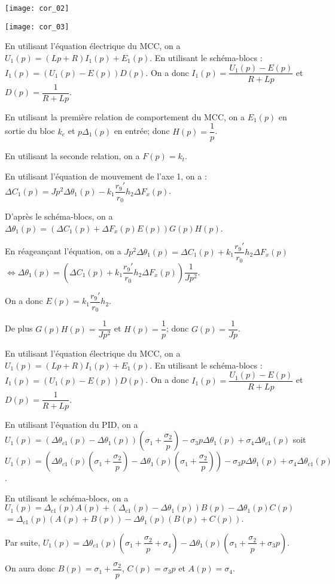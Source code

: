 \ifprof
\begin{center}
\texttt{[image: cor\_02]}

\texttt{[image: cor\_03]}
\end{center}
\begin{corrige} 

En utilisant l'équation électrique du MCC, on a 
$U_1(p)=\left(L p   + R\right)I_1(p)+E_1(p)$. En utilisant le schéma-blocs :  $I_1(p)=\left(U_1(p) - E(p)\right) D(p)$. On a donc 
$I_1(p)=\dfrac{U_1(p) - E(p)}{R+Lp}$ et $D(p) = \dfrac{1}{R+Lp}$.

En utilisant la première relation de comportement du MCC, on a $E_1(p)$ en sortie du bloc $k_e$ et $p\Delta_1(p)$ en entrée; donc $H(p)=\dfrac{1}{p}$.

En utilisant la seconde relation, on a $F(p)=k_t$.

En utilisant l'équation de mouvement de l'axe 1, on a :
$\Delta C_1(p)=J p ^2  \Delta \theta_1(p) - k_1 \dfrac{r_9'}{r_0}h_2 \Delta F_x(p)$.

D'après le schéma-blocs, on a $\Delta \theta_1(p) = \left(\Delta C_1(p)+\Delta F_x(p) E(p)\right) G(p)H(p)$.

En réageançant l'équation, on a 
$J p ^2  \Delta \theta_1(p) = \Delta C_1(p) +  k_1 \dfrac{r_9'}{r_0}h_2 \Delta F_x(p) $
$ \Leftrightarrow   \Delta \theta_1(p) = \left(\Delta C_1(p) +  k_1 \dfrac{r_9'}{r_0}h_2 \Delta F_x(p)\right) \dfrac{1}{J p ^2} $.

On a donc $E(p)= k_1 \dfrac{r_9'}{r_0}h_2 $. 

De plus $G(p)H(p)=\dfrac{1}{Jp^2}$ et $H(p)=\dfrac{1}{p}$; donc $G(p)=\dfrac{1}{Jp}$.


En utilisant l'équation électrique du MCC, on a 
$U_1(p)=\left(L p   + R\right)I_1(p)+E_1(p)$. En utilisant le schéma-blocs :  $I_1(p)=\left(U_1(p) - E(p)\right) D(p)$. On a donc 
$I_1(p)=\dfrac{U_1(p) - E(p)}{R+Lp}$ et $D(p) = \dfrac{1}{R+Lp}$.


En utilisant l'équation du PID, on a 
$U_1(p)=\left( \Delta \theta_{c1}(p)-\Delta \theta_1(p)\right) \left(\sigma_1 + \dfrac{\sigma_2}{p}\right)- \sigma_3p \Delta \theta_1(p)+\sigma_4\Delta \theta_{c1}(p)$
soit $U_1(p)=\left( \Delta \theta_{c1}(p) \left(\sigma_1 + \dfrac{\sigma_2}{p}\right) -\Delta \theta_1(p) \left(\sigma_1 + \dfrac{\sigma_2}{p}\right)\right) - \sigma_3p \Delta \theta_1(p)+\sigma_4\Delta \theta_{c1}(p)$.

En utilisant le schéma-blocs, on a 
$U_1(p)=\Delta_{c1}(p) A(p) + \left(\Delta_{c1}(p) -\Delta\theta_{1}(p)\right) B(p) - \Delta\theta_{1}(p)C(p)$
$=\Delta_{c1}(p) \left( A(p) + B(p)\right) -\Delta\theta_{1}(p)  \left(B(p)+C(p)\right)$.

Par suite, 
$U_1(p)= \Delta \theta_{c1}(p) \left(\sigma_1 + \dfrac{\sigma_2}{p} +\sigma_4\right) -\Delta \theta_1(p) \left(\sigma_1 + \dfrac{\sigma_2}{p} + \sigma_3p\right)$.

On aura donc $B(p)=\sigma_1 + \dfrac{\sigma_2}{p}$, $C(p)=\sigma_3 p$ et  $A(p)=\sigma_4$.



\end{corrige}
\else
\fi



